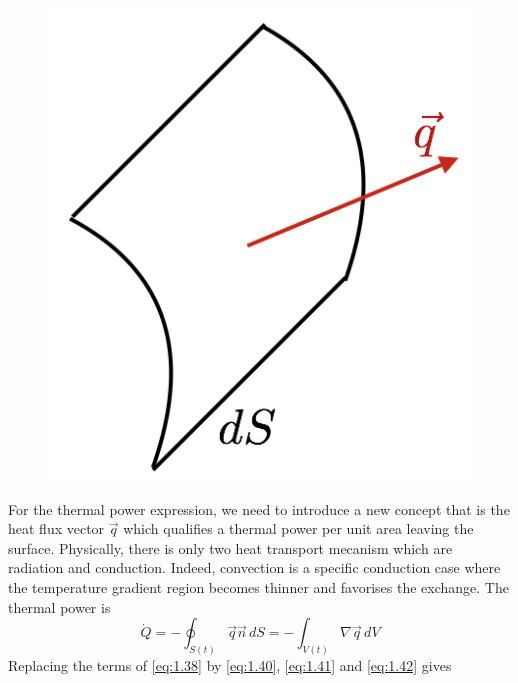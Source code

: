 		\begin{figure}
		\vspace{-5mm}
		\includegraphics[scale=0.3]{ch1/6}
		\end{figure}
		For the thermal power expression, we need to introduce a new concept that is the heat flux vector $\vec{q}$ which qualifies a thermal power per unit area leaving the surface. Physically, there is only two heat transport mecanism which are radiation and conduction. Indeed, convection is a specific conduction case where the temperature gradient region becomes thinner and favorises the exchange. The thermal power is 
		\begin{equation}
			\dot{Q} =  - \oint _{S(t)} \vec{q} \vec{n} \, dS = - \int _{V(t)} \nabla \vec{q} \, dV
			\label{eq:1.42}
		\end{equation}
		Replacing the terms of \eqref{eq:1.38} by \eqref{eq:1.40}, \eqref{eq:1.41} and \eqref{eq:1.42} gives 
		\begin{center}
		\end{center}
		
